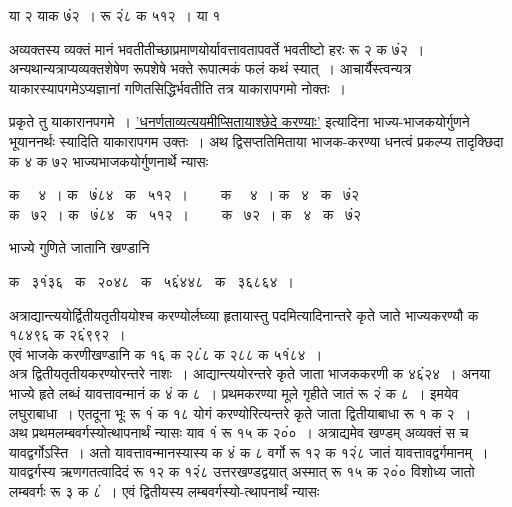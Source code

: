 \documentclass[11pt, openany]{book}
\begin{document}
\begin{sloppypar}
या २ याक ७ं२~। रू २ं८ क ५१२~। या १ \\
\vspace{-2mm}

\noindent अव्यक्तस्य व्यक्तं मानं भवतीतीच्छाप्रमाणयोर्यावत्तावतापवर्ते भवतीष्टो हरः रू २ क ७ं२~। अन्यथान्यत्राप्यव्यक्तशेषेण रूपशेषे भक्ते रूपात्मकं फलं कथं स्यात्~। आचार्यैस्त्वन्यत्र याकारस्यापगमेऽप्यज्ञानां गणितसिद्धिर्भवतीति तत्र याकारापगमो नोक्तः~।
\end{sloppypar}

\newpage

\begin{sloppypar}
\noindent प्रकृते तु याकारानपगमे~। \hyperref[4.38]{'धनर्णताव्यत्ययमीप्सितायाश्छेदे करण्याः'} इत्यादिना भाज्य-भाजकयोर्गुणने भूयाननर्थः स्यादिति याकारापगम उक्तः~। अथ द्विसप्ततिमिताया भाजक-करण्या धनत्वं प्रकल्प्य तादृक्छिदा क ४ क ७२ भाज्यभाजकयोर्गुणनार्थे न्यासः
\vspace{-1mm}

\begin{center}
क ~~४~। क ~७ं८४ ~क ~५१२~। ~~~~क ~~४~। \;क ~४ ~क ~७ं२\\
क ~७२~। क ~७ं८४ ~क ~५१२~। ~~~~क ~७२~। क ~४ ~क ~७ं२
\end{center}
\vspace{-1mm}

\noindent भाज्ये गुणिते जातानि खण्डानि
\vspace{-1mm}

\begin{center}
क ~३१ं३६ ~क ~२०४८ ~क ~५६ं४४८ ~क ~३६८६४~।
\end{center}
\vspace{-1mm}

\noindent अत्राद्यान्त्ययोर्द्वितीयतृतीययोश्च करण्योर्लघ्व्या हृतायास्तु पदमित्यादिनान्तरे कृते जाते भाज्यकरण्यौ क १८४९६ क २६ं९९२~।\\

एवं भाजके करणीखण्डानि क १६ क २८ं८ क २८८ क ५१ं८४~।\\

अत्र द्वितीयतृतीयकरण्योरन्तरे नाशः~। आद्यान्त्ययोरन्तरे कृते जाता भाजककरणी क ४६ं२४~। अनया भाज्ये हृते लब्धं यावत्तावन्मानं क ४ं क ८~। प्रथमकरण्या मूले गृहीते जातं रू २ं क ८~। इमयेव लघुराबाधा~। एतदूना भूः रू १ं क १८ योगं करण्योरित्यन्तरे कृते जाता द्वितीयाबाधा रू १ क २~।\\

अथ प्रथमलम्बवर्गस्योत्थापनार्थं न्यासः याव १ं रू १५ क २०ं०~। अत्राद्यमेव खण्डम् अव्यक्तं स च यावद्वर्गोऽस्ति~। अतो यावत्तावन्मानस्यास्य क ४ं क ८ वर्गो रू १२ क १२ं८ जातं यावत्तावद्वर्गमानम्~। यावद्वर्गस्य ऋणगतत्वादिदं रू १२ क १२ं८ उत्तरखण्डद्वयात् अस्मात् रू १५ क २०ं० विशोध्य जातो लम्बवर्गः रू ३ क ८ं~। एवं द्वितीयस्य लम्बवर्गस्यो-त्थापनार्थं न्यासः
\vspace{-2mm}


\end{sloppypar}
\end{document}
